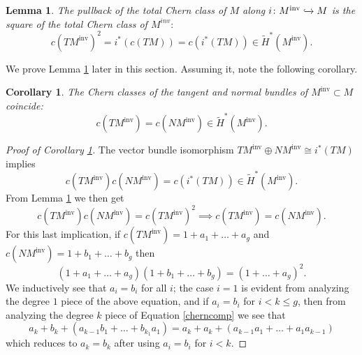 \documentclass[11pt]{amsart}
\newtheorem{lemma}[theorem]{Lemma}
\newtheorem{corollary}[theorem]{Corollary}
\theoremstyle{definition}
\theoremstyle{remark}
\newcommand{\M}{M^{\operatorname{inv}}}
\numberwithin{equation}{section}
\begin{document}
\begin{lemma}\label{chernsquare}
The pullback of the total Chern class of $M$ along $i\colon \M \xhookrightarrow{} M$ is the square of the total Chern class of $M^{inv}:$
\begin{equation}
c(T\M)^2=i^*(c(TM))=c(i^*(TM))\in \widetilde{H}^{*}(\M).
\end{equation}
\end{lemma}
We prove Lemma \ref{chernsquare} later in this section. Assuming it, note the following corollary.
\begin{corollary}\label{chernTN}
The Chern classes of the tangent and normal bundles of $\M\subset M$ coincide:
\begin{equation}
c(T\M)=c(N\M)\in \widetilde{H}^{*}(\M).
\end{equation}
\end{corollary}
\begin{proof}[Proof of Corollary \ref{chernTN}]
The vector bundle isomorphism $T\M\oplus N\M\cong i^*(TM)$ implies \[
c(T\M)c(N\M)=c(i^*(TM))\in \widetilde{H}^{*}(\M).
\]
From Lemma \ref{chernsquare} we then get
\[
c(T\M)c(N\M)=c(T\M)^2\implies c(T\M)=c(N\M).
\]For this last implication, if $c(T\M)=1+a_1+\hdots +a_g$ and $c(N\M)=1+b_1+\hdots +b_g$ then \begin{equation}\label{cherncomp}(1+a_1+\hdots +a_g)(1+b_1+\hdots +b_g)=(1+\hdots +a_g)^2.\end{equation}We inductively see that $a_i=b_i$ for all $i$; the case $i=1$ is evident from analyzing the degree $1$ piece of the above equation, and if $a_i=b_i$ for $i< k\le g$, then from analyzing the degree $k$ piece of Equation \ref{cherncomp} we see that \[a_k+b_k+(a_{k-1}b_1+\hdots +b_{k_1}a_1)=a_k+a_k+(a_{k-1}a_1+\hdots +a_1a_{k-1})\] which reduces to $a_k=b_k$ after using $a_i=b_i$ for $i<k$.
\end{proof}
\end{document}
